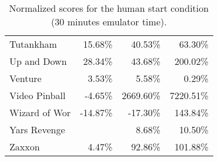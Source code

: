 \documentclass[letterpaper]{article}
\begin{document}
\begin{table*}[h]
\begin{tabular}{lrrr}
Tutankham & 15.68\% & 40.53\% & 63.30\% \\
Up and Down & 28.34\% & 43.68\% & 200.02\% \\
Venture & 3.53\% & 5.58\% & 0.29\% \\
Video Pinball & -4.65\% & 2669.60\% & 7220.51\% \\
Wizard of Wor & -14.87\% & -17.30\% & 143.84\% \\
Yars Revenge &  & 8.68\% & 10.50\% \\
Zaxxon & 4.47\% & 92.86\% & 101.88\% \\
\end{tabular}
\caption{\label{table:at30_rnd_norm} Normalized scores for the human start condition (30 minutes emulator time).}
\end{table*}
\end{document}
